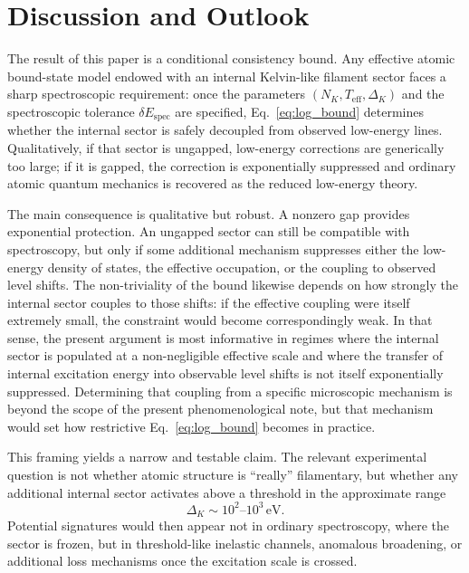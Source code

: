 \documentclass[pdflatex,sn-mathphys-num]{sn-jnl}
\begin{document}
    \section{Discussion and Outlook}\label{sec:outlook}
        The result of this paper is a conditional consistency bound. Any effective atomic bound-state model endowed with an internal Kelvin-like filament sector faces a sharp spectroscopic requirement: once the parameters $(N_K,T_{\mathrm{eff}},\Delta_K)$ and the spectroscopic tolerance $\delta E_{\mathrm{spec}}$ are specified, Eq.~\eqref{eq:log_bound} determines whether the internal sector is safely decoupled from observed low-energy lines. Qualitatively, if that sector is ungapped, low-energy corrections are generically too large; if it is gapped, the correction is exponentially suppressed and ordinary atomic quantum mechanics is recovered as the reduced low-energy theory.

        The main consequence is qualitative but robust. A nonzero gap provides exponential protection. An ungapped sector can still be compatible with spectroscopy, but only if some additional mechanism suppresses either the low-energy density of states, the effective occupation, or the coupling to observed level shifts. The non-triviality of the bound likewise depends on how strongly the internal sector couples to those shifts: if the effective coupling were itself extremely small, the constraint would become correspondingly weak. In that sense, the present argument is most informative in regimes where the internal sector is populated at a non-negligible effective scale and where the transfer of internal excitation energy into observable level shifts is not itself exponentially suppressed. Determining that coupling from a specific microscopic mechanism is beyond the scope of the present phenomenological note, but that mechanism would set how restrictive Eq.~\eqref{eq:log_bound} becomes in practice.

        This framing yields a narrow and testable claim. The relevant experimental question is not whether atomic structure is ``really'' filamentary, but whether any additional internal sector activates above a threshold in the approximate range
        \begin{equation}
            \Delta_K \sim 10^2\text{--}10^3\,\mathrm{eV}.
        \end{equation}
        Potential signatures would then appear not in ordinary spectroscopy, where the sector is frozen, but in threshold-like inelastic channels, anomalous broadening, or additional loss mechanisms once the excitation scale is crossed.
\end{document}
